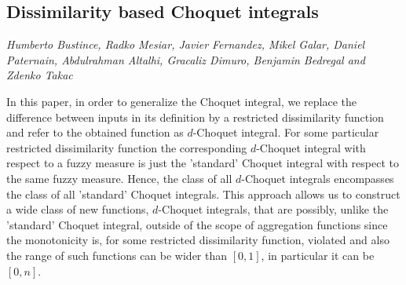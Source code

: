 \documentclass[../booklet.tex]{subfiles}
\begin{document}
\subsection[Dissimilarity based Choquet integrals. {\it Humberto Bustince, Radko Mesiar, Javier Fernandez, Mikel Galar, Daniel Paternain, Abdulrahman Altalhi, Gracaliz Dimuro, Benjamin Bedregal and Zdenko Takac}]{Dissimilarity based Choquet integrals}
        

\begin{center}
  {\it Humberto Bustince, Radko Mesiar, Javier Fernandez, Mikel Galar, Daniel Paternain, Abdulrahman Altalhi, Gracaliz Dimuro, Benjamin Bedregal and Zdenko Takac}
\end{center}



In this paper, in order to generalize the Choquet integral, we replace the difference between inputs in its definition by a restricted dissimilarity function and refer to the obtained function as $d$-Choquet integral. For some particular restricted dissimilarity function the corresponding $d$-Choquet integral with respect to a fuzzy measure is just the 'standard' Choquet integral with respect to the same fuzzy measure. Hence, the class of all $d$-Choquet integrals encompasses the class of all 'standard' Choquet integrals. This approach allows us to construct a wide class of new functions, $d$-Choquet integrals, that are possibly, unlike the 'standard' Choquet integral, outside of the scope of aggregation functions since the monotonicity is, for some restricted dissimilarity function, violated and also the range of such functions can be wider than $[0,1]$, in particular it can be $[0,n]$.

\end{document}
